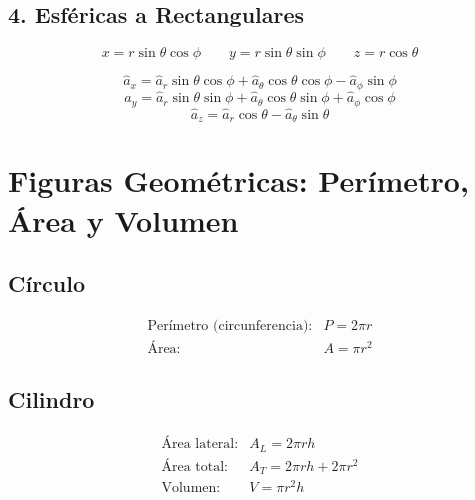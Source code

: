 \documentclass[11pt]{article}
\begin{document}
\begin{multicols}{2}
\section{4. Esféricas a Rectangulares}
\begin{equation}
x = r \sin \theta \cos \phi \qquad 
y = r \sin \theta \sin \phi \qquad 
z = r \cos \theta
\end{equation}


\begin{equation}
    \hat{a}_x = \hat{a}_r \sin \theta \cos \phi + \hat{a}_\theta \cos \theta \cos \phi - \hat{a}_\phi \sin \phi
\end{equation}
\begin{equation}
    \hat{a}_y = \hat{a}_r \sin \theta \sin \phi + \hat{a}_\theta \cos \theta \sin \phi + \hat{a}_\phi \cos \phi
\end{equation}
\begin{equation}
    \hat{a}_z = \hat{a}_r \cos \theta - \hat{a}_\theta \sin \theta
\end{equation}

\end{multicols}


\newpage

\section{Figuras Geométricas: Perímetro, Área y Volumen}

\subsection{Círculo}
\begin{equation*}
\begin{array}{ll}
\text{Perímetro (circunferencia):} & P = 2\pi r \\[5pt]
\text{Área:} & A = \pi r^2
\end{array}
\end{equation*}

\subsection{Cilindro}
\begin{equation*}
\begin{array}{ll}
\text{Área lateral:} & A_L = 2\pi r h \\[5pt]
\text{Área total:} & A_T = 2\pi r h + 2\pi r^2 \\[5pt]
\text{Volumen:} & V = \pi r^2 h
\end{array}
\end{equation*}
\end{document}
